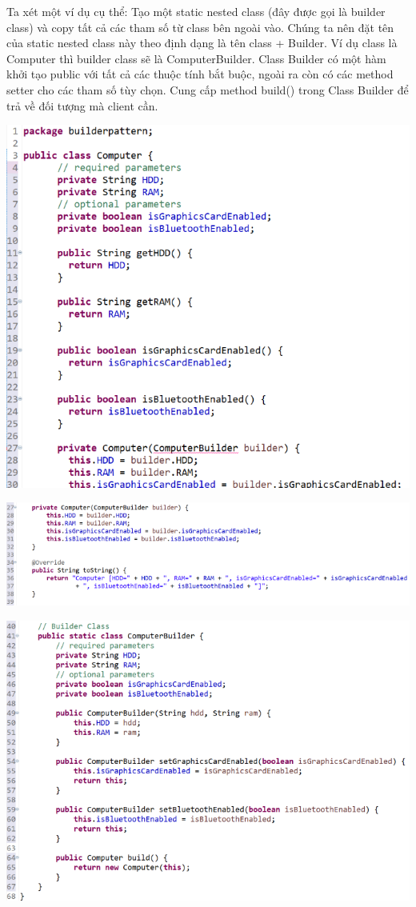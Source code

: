 Ta xét một ví dụ cụ thể: Tạo một static nested class (đây được gọi là builder class) và copy tất cả các tham số từ class bên ngoài vào. Chúng ta nên đặt tên của static nested class này theo định dạng là tên class + Builder. Ví dụ class là Computer thì builder class sẽ là ComputerBuilder. Class Builder có một hàm khởi tạo public với tất cả các thuộc tính bắt buộc, ngoài ra còn có các method setter cho các tham số tùy chọn. Cung cấp method build() trong Class Builder để trả về đối tượng mà client cần.
\begin{center}
\includegraphics{GALLEYS/images/chapter10/code1}
\end{center}
\begin{center}
\includegraphics{GALLEYS/images/chapter10/code2}
\end{center}
\begin{center}
\includegraphics{GALLEYS/images/chapter10/code3}
\end{center}
